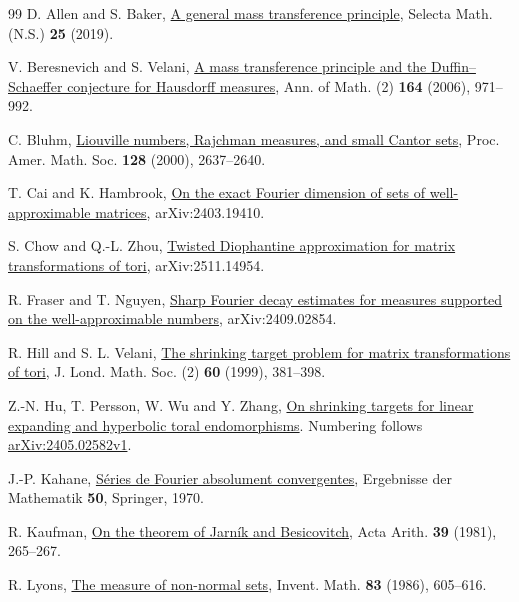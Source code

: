 \documentclass[11pt,a4paper,reqno]{amsart}
\theoremstyle{definition}
\theoremstyle{remark}
\numberwithin{equation}{section}
\begin{document}
\begin{thebibliography}{99}
 D. Allen and S. Baker, \href{https://doi.org/10.1007/s00029-019-0484-9}{A general mass transference principle}, Selecta Math. (N.S.) \textbf{25} (2019).

 V. Beresnevich and S. Velani, \href{https://doi.org/10.4007/annals.2006.164.971}{A mass transference principle and the Duffin--Schaeffer conjecture for Hausdorff measures}, Ann. of Math. (2) \textbf{164} (2006), 971--992.

 C. Bluhm, \href{https://doi.org/10.1090/S0002-9939-00-05276-X}{Liouville numbers, Rajchman measures, and small Cantor sets}, Proc. Amer. Math. Soc. \textbf{128} (2000), 2637--2640.

 T. Cai and K. Hambrook, \href{https://arxiv.org/abs/2403.19410}{On the exact Fourier dimension of sets of well-approximable matrices}, arXiv:2403.19410.

 S. Chow and Q.-L. Zhou, \href{https://arxiv.org/html/2511.14954v1}{Twisted Diophantine approximation for matrix transformations of tori}, arXiv:2511.14954.

 R. Fraser and T. Nguyen, \href{https://arxiv.org/abs/2409.02854}{Sharp Fourier decay estimates for measures supported on the well-approximable numbers}, arXiv:2409.02854.

 R. Hill and S. L. Velani, \href{https://doi.org/10.1112/S0024610799007681}{The shrinking target problem for matrix transformations of tori}, J. Lond. Math. Soc. (2) \textbf{60} (1999), 381--398.

 Z.-N. Hu, T. Persson, W. Wu and Y. Zhang, \href{https://doi.org/10.1112/jlms.70287}{On shrinking targets for linear expanding and hyperbolic toral endomorphisms}. Numbering follows \href{https://arxiv.org/html/2405.02582v1}{arXiv:2405.02582v1}.

 J.-P. Kahane, \href{https://doi.org/10.1007/978-3-662-59158-1}{S\'eries de Fourier absolument convergentes}, Ergebnisse der Mathematik \textbf{50}, Springer, 1970.

 R. Kaufman, \href{https://doi.org/10.4064/aa-39-3-265-267}{On the theorem of Jarn\'ik and Besicovitch}, Acta Arith. \textbf{39} (1981), 265--267.

 R. Lyons, \href{https://gdz.sub.uni-goettingen.de/download/pdf/PPN356556735_0083/LOG_0050.pdf}{The measure of non-normal sets}, Invent. Math. \textbf{83} (1986), 605--616.


\end{thebibliography}
\end{document}
